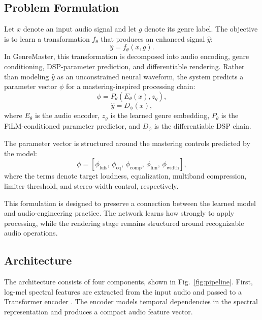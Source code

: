 \documentclass[journal]{IEEEtran}
\begin{document}
\subsection{Problem Formulation}
Let $x$ denote an input audio signal and let $g$ denote its genre label. The objective is to learn a transformation $f_\theta$ that produces an enhanced signal $\hat{y}$:
\begin{equation}
\hat{y}=f_\theta(x,g).
\end{equation}
In GenreMaster, this transformation is decomposed into audio encoding, genre conditioning, DSP-parameter prediction, and differentiable rendering. Rather than modeling $\hat{y}$ as an unconstrained neural waveform, the system predicts a parameter vector $\phi$ for a mastering-inspired processing chain:
\begin{equation}
\phi = P_\theta(E_\theta(x), z_g),
\end{equation}
\begin{equation}
\hat{y}=D_\phi(x),
\end{equation}
where $E_\theta$ is the audio encoder, $z_g$ is the learned genre embedding, $P_\theta$ is the FiLM-conditioned parameter predictor, and $D_\phi$ is the differentiable DSP chain.

The parameter vector is structured around the mastering controls predicted by the model:
\begin{equation}
\phi = [\phi_{\mathrm{lufs}},\, \phi_{\mathrm{eq}},\, \phi_{\mathrm{comp}},\, \phi_{\mathrm{lim}},\, \phi_{\mathrm{width}}],
\end{equation}
where the terms denote target loudness, equalization, multiband compression, limiter threshold, and stereo-width control, respectively.

This formulation is designed to preserve a connection between the learned model and audio-engineering practice. The network learns how strongly to apply processing, while the rendering stage remains structured around recognizable audio operations.

\subsection{Architecture}
The architecture consists of four components, shown in Fig.~\ref{fig:pipeline}. First, log-mel spectral features are extracted from the input audio and passed to a Transformer encoder \cite{vaswani2017attention}. The encoder models temporal dependencies in the spectral representation and produces a compact audio feature vector.
\end{document}

